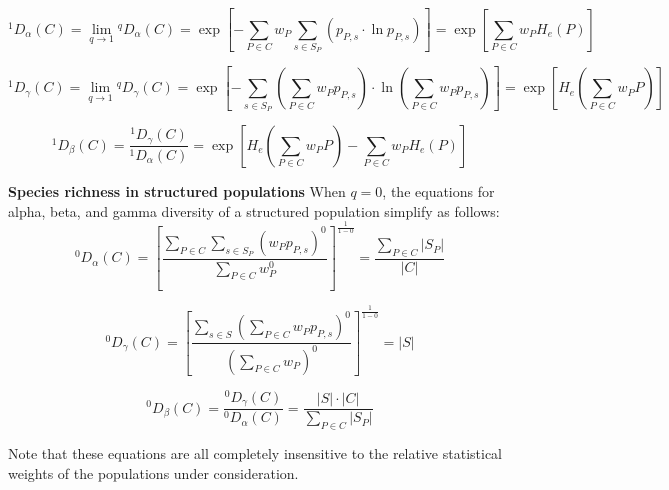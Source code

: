 \begin{equation}
^1D_\alpha(C)
= \lim_{q \to 1} {^qD}_\alpha(C)
= \exp\left[-\sum_{P \in C}w_P\sum_{s \in S_P}(p_{P,s}\cdot\ln p_{P,s})\right]
= \exp\left[\sum_{P \in C}w_PH_e(P)\right]
\label{eq:diversity_alpha_q1}
\end{equation} %

\begin{equation}
^1D_\gamma(C)
= \lim_{q \to 1} {^qD}_\gamma(C)
= \exp\left[-\sum_{s \in S_P}\left(\sum_{P \in C}w_Pp_{P,s}\right)\cdot\ln \left(\sum_{P \in C}w_Pp_{P,s}\right)\right]
= \exp\left[H_e\left(\sum_{P \in C}w_PP\right)\right]
\label{eq:diversity_gamma_q1}
\end{equation} %

\begin{equation}
^1D_\beta(C) = \frac{^1D_\gamma(C)}{^1D_\alpha(C)}
= \exp\left[H_e\left(\sum_{P \in C}w_PP\right) - \sum_{P \in C}w_PH_e(P)\right]
\label{eq:diversity_beta_q1}
\end{equation} %


\begin{tcolorbox}
\textbf{Species richness in structured populations}
When $q=0$, the equations for alpha, beta, and gamma diversity of a structured population simplify as follows:
\begin{equation}
^0D_\alpha(C)
= \left[\frac{\displaystyle\sum_{P \in C}\sum_{s \in S_P} (w_Pp_{P,s})^0}{\displaystyle\sum_{P \in C} w_P^0}\right]^\frac{1}{1-0}
= \frac{\displaystyle\sum_{P \in C}|S_P|}{\displaystyle |C|}
\label{eq:diversity_alpha_q0}
\end{equation} %

\begin{equation}
^0D_\gamma(C)
= \left[\frac{\displaystyle\sum_{s \in S}\left(\sum_{P \in C} w_Pp_{P,s}\right)^0}{\displaystyle\left(\sum_{P \in C} w_P\right)^0}\right]^\frac{1}{1-0}
= |S|
\label{eq:diversity_gamma_q0}
\end{equation} %

\begin{equation}
^0D_\beta(C) = \frac{^0D_\gamma(C)}{^0D_\alpha(C)}
= \frac{\displaystyle |S| \cdot |C|}{\displaystyle\sum_{P \in C}|S_P|}
\label{eq:diversity_beta_q0}
\end{equation} %

Note that these equations are all completely insensitive to the relative statistical weights of the populations under consideration.

\end{tcolorbox}

